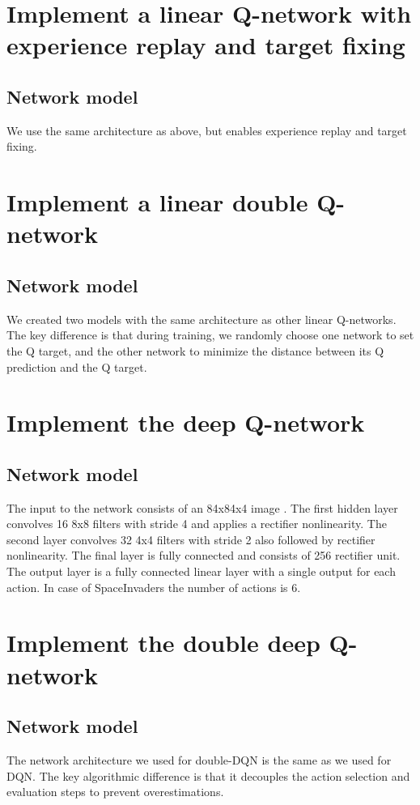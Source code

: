 \documentclass{article}
\begin{document}
\section*{Implement a linear Q-network with experience replay and target fixing}
\subsection*{Network model} 
We use the same architecture as above, but enables experience replay and target fixing. 

\section*{Implement a linear double Q-network}
\subsection*{Network model}
We created two models with the same architecture as other linear Q-networks. The key difference is that during training, we randomly choose one network to set the Q target, and the 
other network to minimize the distance between its Q prediction and the Q target. 

\section*{Implement the deep Q-network}
\subsection*{Network model}
The input to the network consists of an 84x84x4 image . The first hidden layer convolves 16 8x8 filters with stride 4 and applies a rectifier nonlinearity. The second layer convolves 32 4x4 filters with stride 2 also followed by rectifier nonlinearity. The final layer is fully connected and consists of 256 rectifier unit. The output layer is a fully connected linear layer with a single output for each action. In case of SpaceInvaders the number of actions is 6.


\section*{Implement the double deep Q-network}
\subsection*{Network model}
The network architecture we used for double-DQN is the same as we used for DQN. The key algorithmic difference is that it decouples the action selection and evaluation steps to prevent overestimations.
\end{document}
